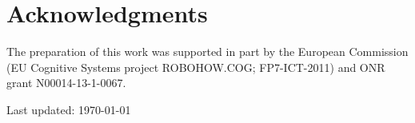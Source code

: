 \documentclass[10pt,letterpaper]{article}
\numberwithin{equation}{section}
\begin{document}
\section*{Acknowledgments}

The preparation of this work was supported in part by the European Commission (EU Cognitive Systems project ROBOHOW.COG; FP7-ICT-2011) and ONR grant N00014-13-1-0067.


\clearpage




\begin{center}
  \begin{footnotesize}
    Last updated: \today 
  \end{footnotesize}
\end{center}
\end{document}
